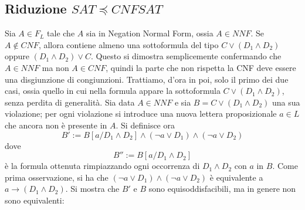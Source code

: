 \subsection{Riduzione $SAT \preceq CNFSAT$}
Sia $A \in F_L$ tale che $A$ sia in Negation Normal Form, ossia $A \in NNF$. 
Se $A \notin CNF$, allora contiene almeno una sottoformula del tipo 
$C \lor (D_1 \land D_2)$ oppure $(D_1 \land D_2) \lor C$. Questo si dimostra 
semplicemente confermando che $A \in NNF$ ma non $A \in CNF$, quindi la parte 
che non rispetta la CNF deve essere una disgiunzione di congiunzioni. Trattiamo, 
d'ora in poi, solo il primo dei due casi, ossia quello in cui nella formula 
appare la sottoformula $C \lor (D_1 \land D_2)$, senza perdita di generalità.
Sia data $A \in NNF$ e sia $B = C \lor (D_1 \land D_2)$ una sua violazione; 
per ogni violazione si introduce una nuova lettera proposizionale $a \in L$ che 
ancora non è presente in $A$. 
Si definisce ora 
$$
B' := B[a/D_1 \land D_2] \land (\neg a \lor D_1) \land (\neg a \lor D_2)
$$
dove 
$$
B'' := B[a/D_1\land D_2]
$$
è la formula ottenuta rimpiazzando ogni occorrenza di $D_1 \land D_2$ con $a$ 
in $B$. 
Come prima osservazione, si ha che $(\neg a \lor D_1) \land (\neg a \lor D_2)$ 
è equivalente a $a \rightarrow (D_1 \land D_2)$. 
Si mostra che $B'$ e $B$ sono equisoddisfacibili, ma in genere non 
sono equivalenti: 
